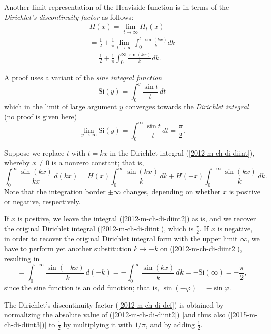 Another limit representation of the Heaviside function is in terms of the
{\em Dirichlet's discontinuity factor} as follows:
\begin{equation}
\begin{split}
H(x)= \lim_{t \rightarrow \infty} H_t (x)
\\
= \frac{1}{2}+\frac{1}{\pi }\lim_{t \rightarrow \infty}\int_0^t \frac{\sin (kx)}{k} dk
\\
=
\frac{1}{2}+\frac{1}{\pi }\int_0^\infty \frac{\sin (kx)}{k} dk
.
\end{split}
\label{2012-m-ch-di-dcf}
\end{equation}

{\color{OliveGreen}
\bproof
A proof \cite{maor1998} uses a variant
of the {\em sine integral function}
\begin{equation}
\textrm{Si}(y) = \int_0^y \frac{\sin t}{t} \,dt
\end{equation}
which in the limit of large argument $y$ converges towards
the {\em Dirichlet integral}   (no proof is given here)
\begin{equation}
\lim_{y \rightarrow  \infty}\textrm{Si}(y) = \int_0^\infty  \frac{\sin t}{t} \,dt= \frac{\pi}{2}.
\label{2012-m-ch-di-diint}
\end{equation}


Suppose we
replace $t$ with $t=kx$
in the Dirichlet integral (\ref{2012-m-ch-di-diint}),
whereby $x\neq 0$ is a nonzero constant; that is,
\begin{equation}
\int_0^\infty  \frac{\sin (kx)}{kx} \,d(kx)
= H(x)\int_0^{\infty}  \frac{\sin (kx)}{k} \,dk
+H(-x)\int_0^{-\infty}  \frac{\sin (kx)}{k} \,dk
.
\label{2012-m-ch-di-diint2}
\end{equation}
Note that the integration border $\pm \infty$ changes, depending on whether $x$ is positive or negative,
respectively.

If $x$ is positive, we leave the integral
(\ref{2012-m-ch-di-diint2})
as is, and we recover the original Dirichlet integral (\ref{2012-m-ch-di-diint}),
which is $\frac{\pi}{2}$.
If $x$ is negative,
in order to recover the original Dirichlet integral form with the upper limit $\infty$,
we have to perform yet another substitution $k \rightarrow -k$
on (\ref{2012-m-ch-di-diint2}), resulting in
\begin{equation}
= \int_0^{-\infty}  \frac{\sin (-kx)}{-k} \,d(-k)
= -\int_0^{\infty}  \frac{\sin (kx)}{k} \,dk
= - \textrm{Si}(\infty ) =  -\frac{\pi}{2}
,
\label{2015-m-ch-di-diint3}
\end{equation}
since the sine function is an odd function; that is, $\sin(-\varphi )=-\sin \varphi $.


The Dirichlet's discontinuity factor (\ref{2012-m-ch-di-dcf})
is obtained by normalizing the absolute value of
(\ref{2012-m-ch-di-diint2}) [and thus also
(\ref{2015-m-ch-di-diint3})]
to $\frac{1}{2}$
by multiplying  it with $1/\pi$, and by adding $\frac{1}{2}$.
\eproof
}

